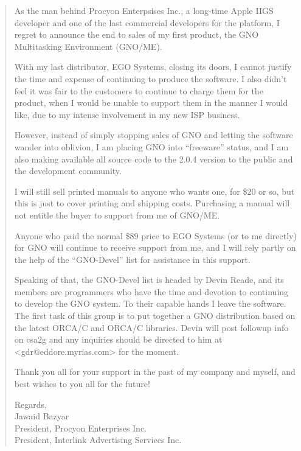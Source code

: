 \documentclass{report}
\begin{document}
\begin{quote}

As the man behind Procyon Enterpsises Inc., a long-time Apple IIGS
developer and one of the last commercial developers for the platform,
I regret to announce the end to sales of my first product, the GNO
Multitasking Environment (GNO/ME).

With my last distributor, EGO Systems, closing its doors, I cannot
justify the time and expense of continuing to produce the software. I
also didn't feel it was fair to the customers to continue to charge them
for the product, when I would be unable to support them in the manner
I would like, due to my intense involvement in my new ISP business.

However, instead of simply stopping sales of GNO and letting the software
wander into oblivion, I am placing GNO into ``freeware'' status, and I am
also making available all source code to the 2.0.4 version to the public
and the development community.

I will still sell printed manuals to anyone who wants one, for \$20 or
so, but this is just to cover printing and shipping costs. Purchasing
a manual will not entitle the buyer to support from me of GNO/ME.

Anyone who paid the normal \$89 price to EGO Systems (or to me directly)
for GNO will continue to receive support from me, and I will rely partly
on the help of the ``GNO-Devel'' list for assistance in this support.

Speaking of that, the GNO-Devel list is headed by Devin Reade,
and its members are programmers who have the time and devotion to
continuing to develop the GNO system. To their capable hands I leave
the software. The first task of this group is to put together a GNO
distribution based on the latest ORCA/C and ORCA/C libraries. Devin will
post followup info on csa2g and any inquiries should be directed to him
at <gdr@eddore.myrias.com> for the moment.

Thank you all for your support in the past of my company and myself,
and best wishes to you all for the future!

\begin{flushleft}
Regards, \\

Jawaid Bazyar \\
President, Procyon Enterprises Inc. \\
President, Interlink Advertising Services Inc. \\
\end{flushleft}

\end{quote}
\end{document}
